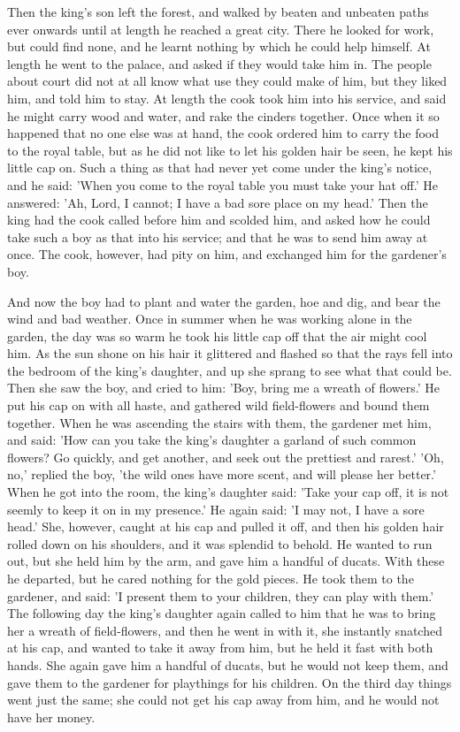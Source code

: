 \documentclass[12pt]{book}
\begin{document}
Then the king's son left the forest, and walked by beaten and unbeaten
paths ever onwards until at length he reached a great city. There he
looked for work, but could find none, and he learnt nothing by which
he could help himself. At length he went to the palace, and asked if
they would take him in. The people about court did not at all know
what use they could make of him, but they liked him, and told him to
stay. At length the cook took him into his service, and said he might
carry wood and water, and rake the cinders together. Once when it so
happened that no one else was at hand, the cook ordered him to carry
the food to the royal table, but as he did not like to let his golden
hair be seen, he kept his little cap on. Such a thing as that had
never yet come under the king's notice, and he said: 'When you come to
the royal table you must take your hat off.' He answered: 'Ah, Lord, I
cannot; I have a bad sore place on my head.' Then the king had the
cook called before him and scolded him, and asked how he could take
such a boy as that into his service; and that he was to send him away
at once. The cook, however, had pity on him, and exchanged him for the
gardener's boy.

And now the boy had to plant and water the garden, hoe and dig, and
bear the wind and bad weather. Once in summer when he was working
alone in the garden, the day was so warm he took his little cap off
that the air might cool him. As the sun shone on his hair it glittered
and flashed so that the rays fell into the bedroom of the king's
daughter, and up she sprang to see what that could be. Then she saw
the boy, and cried to him: 'Boy, bring me a wreath of flowers.' He put
his cap on with all haste, and gathered wild field-flowers and bound
them together. When he was ascending the stairs with them, the
gardener met him, and said: 'How can you take the king's daughter a
garland of such common flowers? Go quickly, and get another, and seek
out the prettiest and rarest.' 'Oh, no,' replied the boy, 'the wild
ones have more scent, and will please her better.' When he got into
the room, the king's daughter said: 'Take your cap off, it is not
seemly to keep it on in my presence.' He again said: 'I may not, I
have a sore head.' She, however, caught at his cap and pulled it off,
and then his golden hair rolled down on his shoulders, and it was
splendid to behold. He wanted to run out, but she held him by the arm,
and gave him a handful of ducats. With these he departed, but he cared
nothing for the gold pieces. He took them to the gardener, and said:
'I present them to your children, they can play with them.' The
following day the king's daughter again called to him that he was to
bring her a wreath of field-flowers, and then he went in with it, she
instantly snatched at his cap, and wanted to take it away from him,
but he held it fast with both hands. She again gave him a handful of
ducats, but he would not keep them, and gave them to the gardener for
playthings for his children. On the third day things went just the
same; she could not get his cap away from him, and he would not have
her money.
\end{document}
